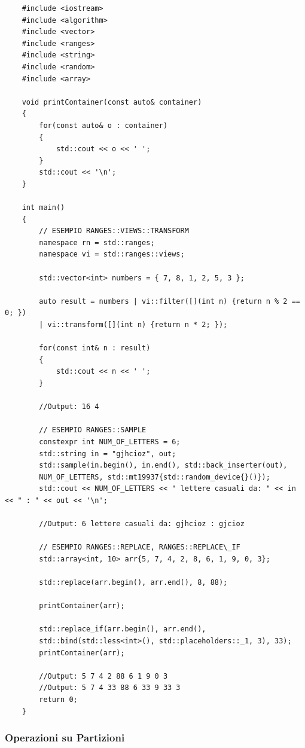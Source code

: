 \label{ranges_seq_modificabili}

\begin{lstlisting}
	#include <iostream>
	#include <algorithm>
	#include <vector>
	#include <ranges>
	#include <string>
	#include <random>
	#include <array>
	
	void printContainer(const auto& container)
	{
		for(const auto& o : container)
		{
			std::cout << o << ' ';
		}
		std::cout << '\n';
	}
	
	int main()
	{
		// ESEMPIO RANGES::VIEWS::TRANSFORM
		namespace rn = std::ranges;
		namespace vi = std::ranges::views;
		
		std::vector<int> numbers = { 7, 8, 1, 2, 5, 3 };
		
		auto result = numbers | vi::filter([](int n) {return n % 2 == 0; })
		| vi::transform([](int n) {return n * 2; });
		
		for(const int& n : result)
		{
			std::cout << n << ' ';
		}
	
		//Output: 16 4
		
		// ESEMPIO RANGES::SAMPLE
		constexpr int NUM_OF_LETTERS = 6;
		std::string in = "gjhcioz", out;
		std::sample(in.begin(), in.end(), std::back_inserter(out),
		NUM_OF_LETTERS, std::mt19937{std::random_device{}()});
		std::cout << NUM_OF_LETTERS << " lettere casuali da: " << in << " : " << out << '\n';
		
		//Output: 6 lettere casuali da: gjhcioz : gjcioz
		
		// ESEMPIO RANGES::REPLACE, RANGES::REPLACE\_IF
		std::array<int, 10> arr{5, 7, 4, 2, 8, 6, 1, 9, 0, 3};
		
		std::replace(arr.begin(), arr.end(), 8, 88);
		
		printContainer(arr);
		
		std::replace_if(arr.begin(), arr.end(), 
		std::bind(std::less<int>(), std::placeholders::_1, 3), 33);
		printContainer(arr);
		
		//Output: 5 7 4 2 88 6 1 9 0 3 
		//Output: 5 7 4 33 88 6 33 9 33 3
		return 0;
	}
\end{lstlisting}

\subsubsection{Operazioni su Partizioni}

\label{ranges_partition}

